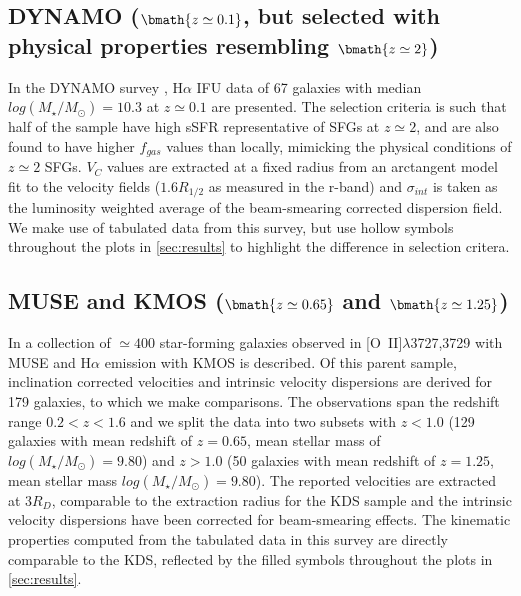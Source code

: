 \documentclass[fleqn,usenatbib]{mnras}
\begin{document}
\subsection{DYNAMO ($\bmath{z\simeq0.1}$, but selected with physical properties resembling $\bmath{z\simeq2}$)}\label{subsec:DYNAMO}
In the DYNAMO survey \citep[G14]{Green2014}, H$\alpha$ IFU data of 67 galaxies with median $log(M_{\star}/M_{\odot})=10.3$ at $z\simeq0.1$ are presented.
The selection criteria is such that half of the sample have high sSFR representative of SFGs at $z\simeq2$, and are also found to have higher $f_{gas}$ values than locally, mimicking the physical conditions of $z\simeq2$ SFGs.
$V_{C}$ values are extracted at a fixed radius from an arctangent model fit to the velocity fields ($1.6R_{1/2}$ as measured in the r-band) and $\sigma_{int}$ is taken as the luminosity weighted average of the beam-smearing corrected dispersion field.
We make use of tabulated data from this survey, but use hollow symbols throughout the plots in \cref{sec:results} to highlight the difference in selection critera.

\subsection{MUSE and KMOS ($\bmath{z\simeq0.65}$ and $\bmath{z\simeq1.25}$)}\label{subsec:MUSE_and_KMOS}
In \cite{Swinbank2017} a collection of $\simeq400$ star-forming galaxies observed in [O~{\sc II}]$\lambda$3727,3729 with MUSE and H$\alpha$ emission with KMOS is described.
Of this parent sample, inclination corrected velocities and intrinsic velocity dispersions are derived for 179 galaxies, to which we make comparisons.
The observations span the redshift range $0.2 < z < 1.6$ and we split the data into two subsets with $z < 1.0$ (129 galaxies with mean redshift of $z = 0.65$, mean stellar mass of $log(M_{\star}/M_{\odot})=9.80$) and $z > 1.0$ (50 galaxies with mean redshift of $z = 1.25$, mean stellar mass $log(M_{\star}/M_{\odot})=9.80$).
The reported velocities are extracted at $3R_{D}$, comparable to the extraction radius for the KDS sample and the intrinsic velocity dispersions have been corrected for beam-smearing effects.
The kinematic properties computed from the tabulated data in this survey are directly comparable to the KDS, reflected by the filled symbols throughout the plots in \cref{sec:results}.
\end{document}

